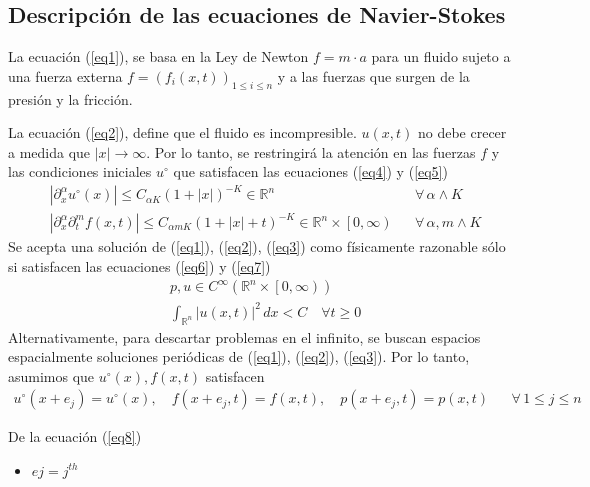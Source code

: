 \subsection{Descripción de las ecuaciones de Navier-Stokes}
La ecuación (\ref{eq1}), se basa en la Ley de Newton $f=m\cdot a$ para un fluido sujeto a una fuerza externa $f= \left(f_i(x,t)\right)_{1\leq i\leq n}$ y a las fuerzas que surgen de la presión y la fricción.

La ecuación (\ref{eq2}), define que el fluido es incompresible.  $u(x, t)$ no debe crecer a medida que $\left\lvert x\right\rvert \to \infty$. Por lo tanto, se restringirá la atención en las fuerzas $f$ y las condiciones iniciales $u^{\circ}$ que satisfacen las ecuaciones (\ref{eq4}) y (\ref{eq5})
\begin{align}
    &\left\lvert \partial_x^{\alpha}u^{\circ}(x) \right\rvert\leq C_{\alpha K}\left(1 + \left\lvert x \right\rvert  \right)^{-K}\in \mathbb{R}^n&& \forall\, \alpha\land K\label{eq4}\\
    &\left\lvert \partial_x^{\alpha}\partial_t^{m} f(x,t) \right\rvert\leq C_{\alpha m K}\left(1 + \left\lvert x \right\rvert + t \right)^{-K}\in \mathbb{R}^n\times \left[ 0,\infty \right)&& \forall\, \alpha, m \land K \label{eq5}
\end{align}
Se acepta una solución de (\ref{eq1}), (\ref{eq2}), (\ref{eq3}) como físicamente razonable sólo si satisfacen las ecuaciones (\ref{eq6}) y (\ref{eq7})
\begin{align}
    &p,u\in C^{\infty}\left( \mathbb{R}^n \times \left[ 0, \infty\right) \right)\label{eq6}\\
    & \int_{\mathbb{R}^n} \left\lvert u(x,t)\right\rvert^2\, dx < C\quad \forall t\geq 0\label{eq7}  
\end{align}
Alternativamente, para descartar problemas en el infinito, se buscan espacios espacialmente soluciones periódicas de (\ref{eq1}), (\ref{eq2}), (\ref{eq3}). Por lo tanto, asumimos que $u^{\circ}(x), f(x,t)$ satisfacen
\begin{align}
    u^{\circ}(x + e_j) = u^{\circ}(x),\quad f(x + e_j,t) = f(x,t),\quad p(x + e_j,t) = p(x,t) && \forall\, 1\leq j\leq n\label{eq8}
\end{align}
\begin{notation} De la ecuación (\ref{eq8})
    \begin{itemize}
        \item $ej = j^{th}$
    \end{itemize}
\end{notation}
